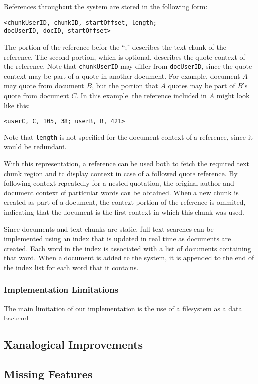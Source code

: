 \documentclass{acm_proc_article-sp}
\begin{document}
References throughout the system are stored in the following form:
\begin{center}
{\tt <chunkUserID, chunkID, startOffset, length;\\ 
docUserID, docID, startOffset>} 
\end{center}
The portion of the reference befor the ``;'' describes the text chunk of the reference.  
The second portion, which is optional, describes the quote context of the reference.  
Note that {\tt chunkUserID} may differ from {\tt docUserID}, since the quote context may be part of a quote in another document.
For example, document $A$ may quote from document $B$, but the portion that $A$ quotes may be part of $B$'s quote from document $C$.
In this example, the reference included in $A$ might look like this:
\begin{center}
{\tt <userC, C, 105, 38; userB, B, 421>} 
\end{center}
Note that {\tt length} is not specified for the document context of a reference, since it would be redundant.

With this representation, a reference can be used both to fetch the required text chunk region and to display context in case of a followed quote reference.
By following context repeatedly for a nested quotation, the original author and document context of particular words can be obtained.
When a new chunk is created as part of a document, the context portion of the reference is ommited, indicating that the document is the first context in which this chunk was used.

Since documents and text chunks are static, full text searches can be implemented using an index that is updated in real time as documents are created.
Each word in the index is associated with a list of documents containing that word.
When a document is added to the system, it is appended to the end of the index list for each word that it contains.

\subsubsection{Implementation Limitations}
The main limitation of our implementation is the use of a filesystem as a data backend.


\subsection{Xanalogical Improvements}


\subsection{Missing Features}
\end{document}
